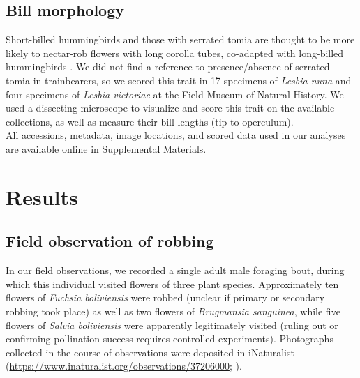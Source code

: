 \documentclass[fleqn,10pt,lineno]{wlpeerj}
\providecommand{\DIFaddtex}[1]{{\protect\color{blue}\uwave{#1}}} %
\providecommand{\DIFdeltex}[1]{{\protect\color{red}\sout{#1}}}                      %
\providecommand{\DIFaddbegin}{} %
\providecommand{\DIFaddend}{} %
\providecommand{\DIFdelbegin}{} %
\providecommand{\DIFdelend}{} %
\providecommand{\DIFadd}[1]{\texorpdfstring{\DIFaddtex{#1}}{#1}} %
\providecommand{\DIFdel}[1]{\texorpdfstring{\DIFdeltex{#1}}{}} %
\begin{document}
\subsection*{Bill morphology}

Short-billed hummingbirds and those with serrated tomia are thought to be more likely to nectar-rob flowers with long corolla tubes, co-adapted with long-billed hummingbirds \citep{lara2001}. 
We did not find a reference to presence/absence of serrated tomia in trainbearers, so we scored this trait in 17 specimens of \textit{Lesbia nuna} and four specimens of \textit{Lesbia victoriae} at the Field Museum of Natural History. %
We used a dissecting microscope to visualize and score this trait on the available collections, as well as measure their bill lengths (tip to operculum\DIFaddbegin \DIFadd{; all performed by I.N.}\DIFaddend ). 
\\ 

\DIFdelbegin %
\DIFdel{All accessions, metadata, image locations, and scored data used in our analyses are available online in Supplemental Materials. %
}%

\DIFdelend %
\section*{Results}

\subsection*{Field observation of robbing}
In our field observations, we recorded a single adult male foraging bout, during which this individual visited flowers of three plant species. Approximately ten flowers of \textit{Fuchsia boliviensis} were robbed (unclear if primary or secondary robbing took place) as well as two flowers of \textit{Brugmansia sanguinea}, while five flowers of \textit{Salvia boliviensis} were apparently legitimately visited (ruling out or confirming pollination success requires controlled experiments). 
Photographs collected in the course of observations were deposited in iNaturalist (\href{https://www.inaturalist.org/observations/37206000}{https://www.inaturalist.org/observations/37206000}; \citealt{inaturalist}).
\end{document}
